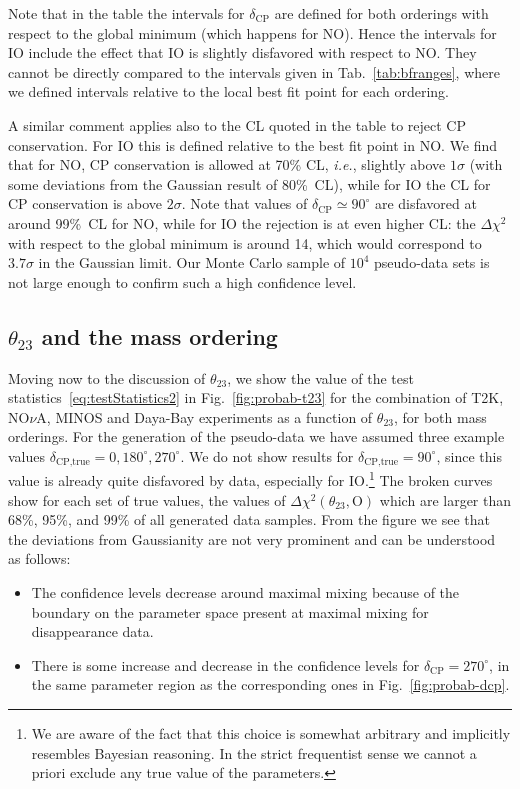 \documentclass[a4paper, 11pt]{article}
\begin{document}
Note that in the table the intervals for $\delta_\text{CP}$ are
defined for both orderings with respect to the global minimum (which
happens for NO). Hence the intervals for IO include the effect that IO
is slightly disfavored with respect to NO. They cannot be directly
compared to the intervals given in Tab.~\ref{tab:bfranges}, where we
defined intervals relative to the local best fit point for each
ordering.

A similar comment applies also to the CL quoted in the table to reject
CP conservation. For IO this is defined relative to the best fit point
in NO. We find that for NO, CP conservation is allowed at 70\% CL,
\textit{i.e.}, slightly above $1\sigma$ (with some deviations from the
Gaussian result of 80\%~CL), while for IO the CL for CP conservation
is above $2\sigma$. Note that values of $\delta_\text{CP} \simeq
90^\circ$ are disfavored at around 99\%~CL for NO, while for IO the
rejection is at even higher CL: the $\Delta\chi^2$ with respect to the
global minimum is around 14, which would correspond to $3.7\sigma$ in
the Gaussian limit. Our Monte Carlo sample of $10^4$ pseudo-data sets
is not large enough to confirm such a high confidence level.

\subsection{$\theta_{23}$ and the mass ordering}

Moving now to the discussion of $\theta_{23}$, we show the value of
the test statistics~\eqref{eq:testStatistics2} in
Fig.~\ref{fig:probab-t23} for the combination of T2K, NO$\nu$A, MINOS
and Daya-Bay experiments as a function of $\theta_{23}$, for both mass
orderings.  For the generation of the pseudo-data we have assumed
three example values $\delta_\text{CP,true} = 0, 180^\circ,
270^\circ$. We do not show results for $\delta_\text{CP,true}
=90^\circ$, since this value is already quite disfavored by data,
especially for IO.\footnote{We are aware of the fact that this choice
  is somewhat arbitrary and implicitly resembles Bayesian
  reasoning. In the strict frequentist sense we cannot a priori
  exclude any true value of the parameters.}  The broken curves show
for each set of true values, the values of $\Delta\chi^2(\theta_{23},
\text{O})$ which are larger than 68\%, 95\%, and 99\% of all generated
data samples. From the figure we see that the deviations from
Gaussianity are not very prominent and can be understood as follows:
%
\begin{itemize}
\item The confidence levels decrease around maximal mixing because of
  the boundary on the parameter space present at maximal mixing for
  disappearance data.

\item There is some increase and decrease in the confidence levels for
  $\delta_\text{CP} = 270^\circ$, in the same parameter region as the
  corresponding ones in Fig.~\ref{fig:probab-dcp}.
\end{itemize}
\end{document}
